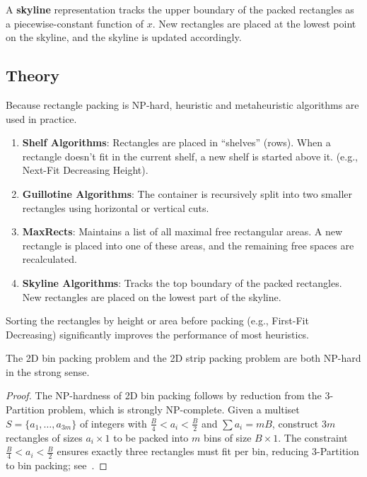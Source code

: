 \begin{definition}[Skyline]\label{def:skyline}
A \textbf{skyline} representation tracks the upper boundary of the packed rectangles as a piecewise-constant function of $x$. New rectangles are placed at the lowest point on the skyline, and the skyline is updated accordingly.
\end{definition}

\subsection{Theory}
Because rectangle packing is NP-hard, heuristic and metaheuristic algorithms are used in practice.
\begin{enumerate}
    \item \textbf{Shelf Algorithms}: Rectangles are placed in ``shelves'' (rows). When a rectangle doesn't fit in the current shelf, a new shelf is started above it. (e.g., Next-Fit Decreasing Height).
    \item \textbf{Guillotine Algorithms}: The container is recursively split into two smaller rectangles using horizontal or vertical cuts.
    \item \textbf{MaxRects}: Maintains a list of all maximal free rectangular areas. A new rectangle is placed into one of these areas, and the remaining free spaces are recalculated.
    \item \textbf{Skyline Algorithms}: Tracks the top boundary of the packed rectangles. New rectangles are placed on the lowest part of the skyline.
\end{enumerate}

Sorting the rectangles by height or area before packing (e.g., First-Fit Decreasing) significantly improves the performance of most heuristics.

\begin{theorem}\label{thm:rect_pack_nphard}
The 2D bin packing problem and the 2D strip packing problem are both NP-hard in the strong sense.
\end{theorem}

\begin{proof}
The NP-hardness of 2D bin packing follows by reduction from the 3-Partition problem, which is strongly NP-complete. Given a multiset $S = \{a_1, \dots, a_{3m}\}$ of integers with $\frac{B}{4} < a_i < \frac{B}{2}$ and $\sum a_i = mB$, construct $3m$ rectangles of sizes $a_i \times 1$ to be packed into $m$ bins of size $B \times 1$. The constraint $\frac{B}{4} < a_i < \frac{B}{2}$ ensures exactly three rectangles must fit per bin, reducing 3-Partition to bin packing; see~\cite[Section~8]{lodi2002}.
\end{proof}

